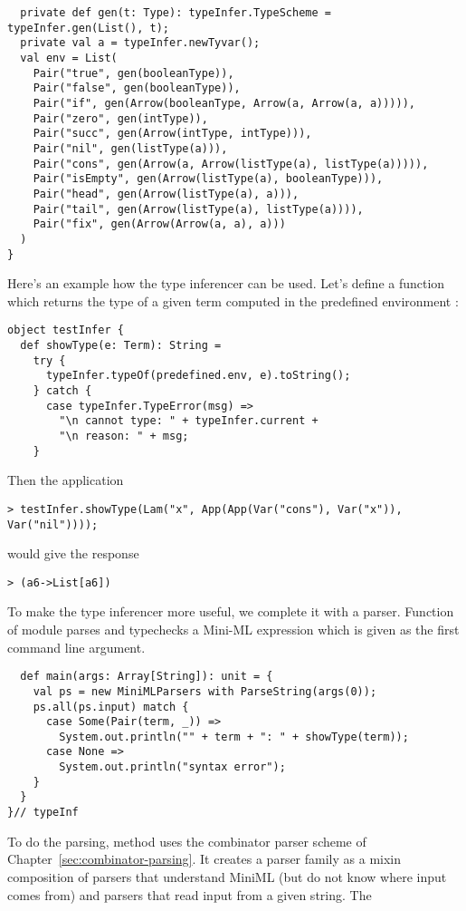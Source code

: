 {\begin{lstlisting}
  private def gen(t: Type): typeInfer.TypeScheme = typeInfer.gen(List(), t);
  private val a = typeInfer.newTyvar();
  val env = List(
    Pair("true", gen(booleanType)),
    Pair("false", gen(booleanType)),
    Pair("if", gen(Arrow(booleanType, Arrow(a, Arrow(a, a))))),
    Pair("zero", gen(intType)),
    Pair("succ", gen(Arrow(intType, intType))),
    Pair("nil", gen(listType(a))),
    Pair("cons", gen(Arrow(a, Arrow(listType(a), listType(a))))),
    Pair("isEmpty", gen(Arrow(listType(a), booleanType))),
    Pair("head", gen(Arrow(listType(a), a))),
    Pair("tail", gen(Arrow(listType(a), listType(a)))),
    Pair("fix", gen(Arrow(Arrow(a, a), a)))
  )
}
\end{lstlisting}
Here's an example how the type inferencer can be used.
Let's define a function  which returns the type of
a given term computed in the predefined environment
:
\begin{lstlisting}
object testInfer {
  def showType(e: Term): String =
    try {
      typeInfer.typeOf(predefined.env, e).toString();
    } catch {
      case typeInfer.TypeError(msg) => 
        "\n cannot type: " + typeInfer.current +
        "\n reason: " + msg;
    }
\end{lstlisting}
Then the application
\begin{lstlisting}
> testInfer.showType(Lam("x", App(App(Var("cons"), Var("x")), Var("nil"))));
\end{lstlisting}
would give the response
\begin{lstlisting}
> (a6->List[a6])
\end{lstlisting}
To make the type inferencer more useful, we complete it with a
parser. 
Function  of module 
parses and typechecks a Mini-ML expression which is given as the first
command line argument.
\begin{lstlisting}
  def main(args: Array[String]): unit = {
    val ps = new MiniMLParsers with ParseString(args(0));
    ps.all(ps.input) match {
      case Some(Pair(term, _)) => 
        System.out.println("" + term + ": " + showType(term));
      case None =>
        System.out.println("syntax error");
    }
  }
}// typeInf
\end{lstlisting}
To do the parsing, method  uses the combinator parser
scheme of Chapter~\ref{sec:combinator-parsing}. It creates a parser
family  as a mixin composition of parsers
that understand MiniML (but do not know where input comes from) and
parsers that read input from a given string.  The 
}
